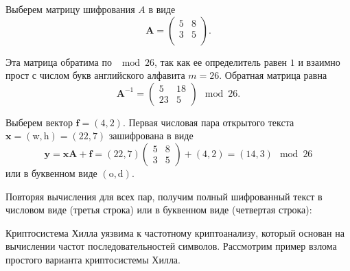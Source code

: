 Выберем матрицу шифрования $A$ в виде
\[
    \mathbf{A} = \left( \begin{array}{cc}
        5 & 8 \\
        3 & 5 \\
    \end{array} \right).
\]

Эта матрица обратима по $\mod 26$, так как ее определитель равен $1$ и взаимно прост с числом букв английского алфавита $m=26$. Обратная матрица равна
\[
    \mathbf{A}^{-1} = \left( \begin{array}{cc}
        5  & 18 \\
        23 & 5
    \end{array} \right) \mod 26.
\]

Выберем вектор $\mathbf{f} = (4, 2)$. Первая числовая пара открытого текста  $\mathbf{x} = (\text{w}, \text{h}) = (22, 7)$  зашифрована в виде
\[
    \mathbf{y} = \mathbf{x} \mathbf{A} + \mathbf{f} =
        (22, 7)
        \left( \begin{array}{cc}
            5 & 8 \\
            3 & 5
        \end{array} \right) +
        (4, 2) = (14, 3) \mod 26
\]
или в буквенном виде  $(\text{o}, \text{d})$.

Повторяя вычисления для всех пар, получим полный шифрованный текст в числовом виде (третья строка) или в буквенном виде (четвертая строка):
\begin{center}  \end{center}
\exampleend

Криптосистема Хилла уязвима к частотному криптоанализу, который основан на вычислении частот последовательностей символов. Рассмотрим пример взлома простого варианта криптосистемы Хилла.

